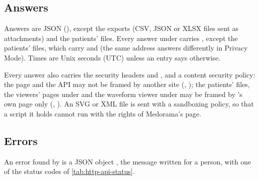 \subsection{Answers}
\label{sec:http-api-answers}

Answers are JSON (), except the exports (CSV, JSON or XLSX files sent as
attachments) and the patients' files. Every answer under  carries
, except the patients' files, which carry
 and  (the same address answers
differently in Privacy Mode). Times are Unix seconds (UTC) unless an entry says otherwise.

Every answer also carries the security headers  and
, and a content security policy: the page and the API may not
be framed by another site (, ); the
patients' files, the viewers' pages under  and the waveform viewer under
 may be framed by \md{}'s own page only (,
). An SVG or XML file is sent with a sandboxing policy, so
that a script it holds cannot run with the rights of Medorama's page.

\subsection{Errors}
\label{sec:http-api-errors}

An error found by \md{} is a JSON object , the message written for a
person, with one of the status codes of \cref{tab:http-api-status}.

